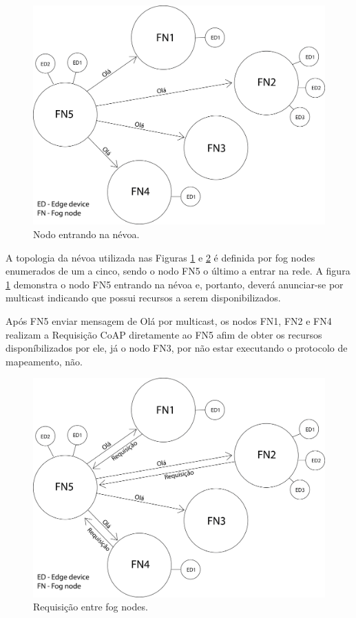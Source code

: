\begin{figure}[H]
    \centering\includegraphics[width=.8\textwidth]{fig5.png}
    \caption[Nodo entrando na névoa]
    {\label{fig:fig5} Nodo entrando na névoa.}
\end{figure}

A topologia da névoa utilizada nas Figuras \ref{fig:fig5} e \ref{fig:fig6} é definida por fog nodes enumerados de um a cinco, sendo o nodo FN5 o último a entrar na rede.
A figura \ref{fig:fig5} demonstra o nodo FN5 entrando na névoa e, portanto, deverá anunciar-se por multicast indicando que possui recursos a serem disponibilizados.

Após FN5 enviar mensagem de Olá por multicast, os nodos FN1, FN2 e FN4 realizam a Requisição CoAP diretamente ao FN5 afim de obter os recursos disponíbilizados por ele,
já o nodo FN3, por não estar executando o protocolo de mapeamento, não.

\begin{figure}[H]
    \centering\includegraphics[width=.8\textwidth]{fig6.png}
    \caption [Requisição entre fog nodes]
    {\label{fig:fig6} Requisição entre fog nodes.}
\end{figure}


